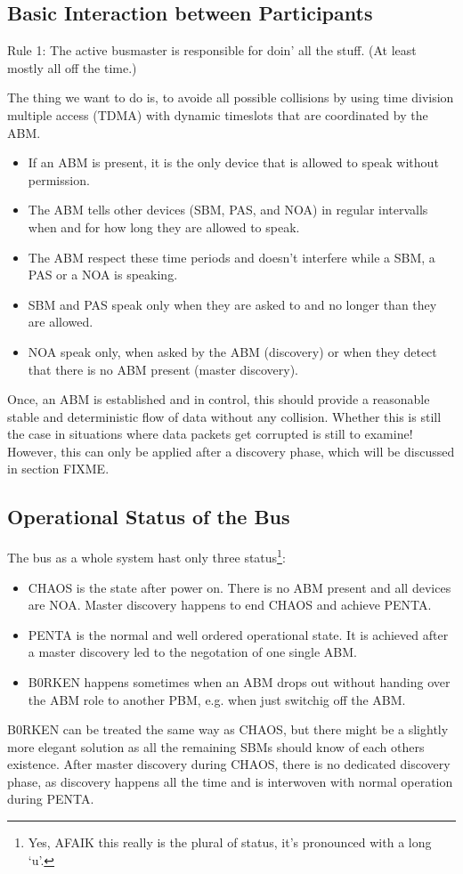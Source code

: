 \documentclass[a4paper,12pt]{scrartcl}
\begin{document}
\subsection{Basic Interaction between Participants}
Rule 1: The active busmaster is responsible for doin' all the stuff. (At least mostly all off the time.)

The thing we want to do is, to avoide all possible collisions by using time division multiple access
(TDMA) with dynamic timeslots that are coordinated by the ABM.

\begin{itemize}
\item If an ABM is present, it is the only device that is allowed to speak without permission.
\item The ABM tells other devices (SBM, PAS, and NOA) in regular intervalls when and for how long they are allowed to speak.
\item The ABM respect these time periods and doesn't interfere while a SBM, a PAS or a NOA is speaking.
\item SBM and PAS speak only when they are asked to and no longer than they are allowed.
\item NOA speak only, when asked by the ABM (discovery) or when they detect that there is no ABM present (master discovery).
\end{itemize}

Once, an ABM is established and in control, this should provide a reasonable stable and deterministic flow of data without any collision.
Whether this is still the case in situations where data packets get corrupted is still to examine!
However, this can only be applied after a discovery phase, which will be discussed in section FIXME.

\subsection{Operational Status of the Bus}
The bus as a whole system hast only three status\footnote{Yes, AFAIK this really is the plural of status, it's pronounced with a long `u'.}:
\begin{itemize}
 \item CHAOS is the state after power on. There is no ABM present and all devices are NOA. Master discovery happens to end CHAOS and achieve PENTA.
 \item PENTA is the normal and well ordered operational state. It is achieved after a master discovery led to the negotation of one single ABM.
 \item B0RKEN happens sometimes when an ABM drops out without handing over the ABM role to another PBM, e.g. when just switchig off the ABM.
\end{itemize}
B0RKEN can be treated the same way as CHAOS, but there might be a slightly more elegant solution as all the remaining SBMs should know of each others existence.
After master discovery during CHAOS, there is no dedicated discovery phase, as discovery happens all the time and is interwoven with normal operation during PENTA.
\end{document}
